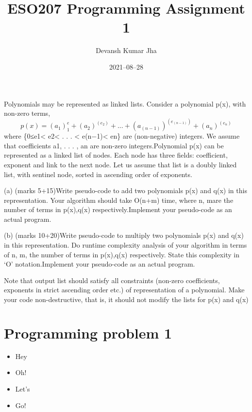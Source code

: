 \documentclass[20pt]{article}
\title{ESO207 Programming Assignment 1}
\author{Devansh Kumar Jha}
\date{2021–08–28}
\begin{document}
\maketitle

Polynomials may be represented as linked lists.  Consider a polynomial p(x),  with non-zero terms, 
\[p(x) =(a_1)^e_1+(a_2)^(e_2)+. . .+(a_(n−1))^(e_(n−1))+(a_n)^(e_n)\] 
where \{0≤e1< e2< . . . < e(n−1)< en\} are (non-negative) integers.  We assume that coefficients a1, . . . , an are non-zero integers.Polynomial p(x) can be represented as a linked list of nodes.  Each node has three fields:  coefficient, exponent and link to the next node.  Let us assume that list is a doubly linked list, with sentinel node, sorted in ascending order of exponents.

(a) (marks 5+15)Write pseudo-code to add two polynomials p(x) and q(x) in this representation.  Your algorithm should take O(n+m) time, where n, mare the number of terms in p(x),q(x) respectively.Implement your pseudo-code as an actual program.

(b) (marks 10+20)Write  pseudo-code  to  multiply  two  polynomials p(x)  and q(x)  in  this representation.   Do  runtime  complexity  analysis  of  your  algorithm  in  terms  of n, m,  the number of terms in p(x),q(x) respectively.  State this complexity in ‘O’ notation.Implement your pseudo-code as an actual program.

Note  that  output  list  should  satisfy  all  constraints  (non-zero  coefficients,  exponents  in  strict ascending order etc.)  of representation of a polynomial.  Make your code non-destructive, that is, it should not modify the lists for p(x) and q(x)
\section{Programming problem 1}

\begin{itemize}
\item Hey
\item Oh!
\item Let’s
\item Go!
\end{itemize}
\end{document}
